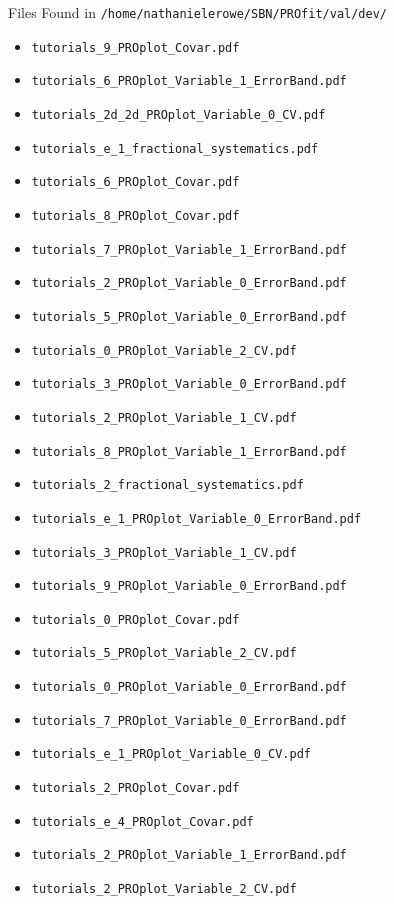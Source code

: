 \documentclass{beamer}
\begin{document}
\begin{frame}{Files Found in \texttt{/home/nathanielerowe/SBN/PROfit/val/dev/}}
\begin{itemize}
    \item \texttt{tutorials\_9\_PROplot\_Covar.pdf}
    \item \texttt{tutorials\_6\_PROplot\_Variable\_1\_ErrorBand.pdf}
    \item \texttt{tutorials\_2d\_2d\_PROplot\_Variable\_0\_CV.pdf}
    \item \texttt{tutorials\_e\_1\_fractional\_systematics.pdf}
    \item \texttt{tutorials\_6\_PROplot\_Covar.pdf}
    \item \texttt{tutorials\_8\_PROplot\_Covar.pdf}
    \item \texttt{tutorials\_7\_PROplot\_Variable\_1\_ErrorBand.pdf}
    \item \texttt{tutorials\_2\_PROplot\_Variable\_0\_ErrorBand.pdf}
    \item \texttt{tutorials\_5\_PROplot\_Variable\_0\_ErrorBand.pdf}
    \item \texttt{tutorials\_0\_PROplot\_Variable\_2\_CV.pdf}
    \item \texttt{tutorials\_3\_PROplot\_Variable\_0\_ErrorBand.pdf}
    \item \texttt{tutorials\_2\_PROplot\_Variable\_1\_CV.pdf}
    \item \texttt{tutorials\_8\_PROplot\_Variable\_1\_ErrorBand.pdf}
    \item \texttt{tutorials\_2\_fractional\_systematics.pdf}
    \item \texttt{tutorials\_e\_1\_PROplot\_Variable\_0\_ErrorBand.pdf}
    \item \texttt{tutorials\_3\_PROplot\_Variable\_1\_CV.pdf}
    \item \texttt{tutorials\_9\_PROplot\_Variable\_0\_ErrorBand.pdf}
    \item \texttt{tutorials\_0\_PROplot\_Covar.pdf}
    \item \texttt{tutorials\_5\_PROplot\_Variable\_2\_CV.pdf}
    \item \texttt{tutorials\_0\_PROplot\_Variable\_0\_ErrorBand.pdf}
    \item \texttt{tutorials\_7\_PROplot\_Variable\_0\_ErrorBand.pdf}
    \item \texttt{tutorials\_e\_1\_PROplot\_Variable\_0\_CV.pdf}
    \item \texttt{tutorials\_2\_PROplot\_Covar.pdf}
    \item \texttt{tutorials\_e\_4\_PROplot\_Covar.pdf}
    \item \texttt{tutorials\_2\_PROplot\_Variable\_1\_ErrorBand.pdf}
    \item \texttt{tutorials\_2\_PROplot\_Variable\_2\_CV.pdf}

\end{itemize}
\end{frame}
\end{document}
